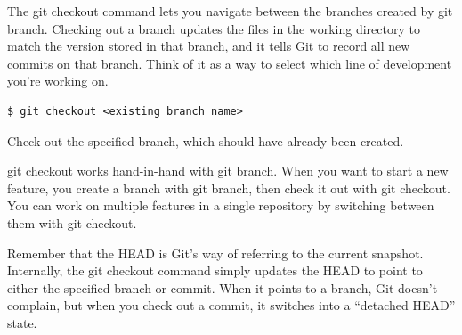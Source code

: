 \documentclass{article}
\begin{document}
The git checkout command lets you navigate between the branches
created by git branch. Checking out a branch updates the files in the
working directory to match the version stored in that branch, and it
tells Git to record all new commits on that branch. Think of it as a
way to select which line of development you're working on.

\begin{lstlisting}
$ git checkout <existing branch name>
\end{lstlisting}

Check out the specified branch, which should have already been
created.

git checkout works hand-in-hand with git branch. When you want to
start a new feature, you create a branch with git branch, then check
it out with git checkout. You can work on multiple features in a
single repository by switching between them with git checkout. 

Remember that the HEAD is Git's way of referring to the current
snapshot. Internally, the git checkout command simply updates the HEAD
to point to either the specified branch or commit. When it points to a
branch, Git doesn't complain, but when you check out a commit, it
switches into a ``detached HEAD'' state.
\end{document}
